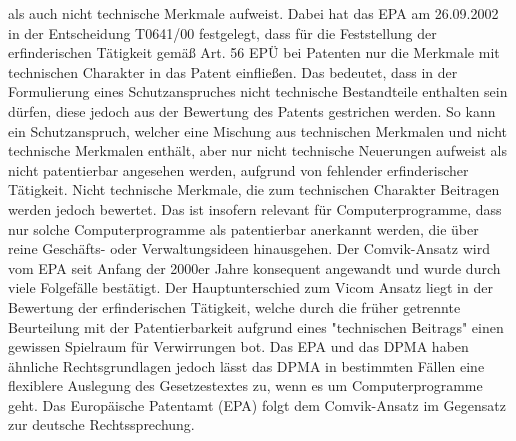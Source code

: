 als auch nicht technische Merkmale aufweist. 
Dabei hat das EPA am 26.09.2002 in der
Entscheidung T0641/00 festgelegt, dass für die Feststellung der
erfinderischen Tätigkeit gemäß Art. 56 EPÜ bei Patenten nur die 
Merkmale mit technischen Charakter in das Patent einfließen.
Das bedeutet, dass in der Formulierung eines Schutzanspruches
nicht technische Bestandteile enthalten sein dürfen, 
diese jedoch aus der Bewertung des Patents gestrichen werden.
So kann ein Schutzanspruch, welcher eine Mischung aus technischen 
Merkmalen und nicht technische 
Merkmalen enthält, aber nur nicht technische Neuerungen aufweist 
als nicht patentierbar angesehen werden, aufgrund von fehlender
erfinderischer Tätigkeit. Nicht technische Merkmale,
die zum technischen Charakter Beitragen werden jedoch bewertet.
Das ist insofern relevant für Computerprogramme,
dass nur solche Computerprogramme als patentierbar anerkannt werden, 
die über reine Geschäfts- oder Verwaltungsideen hinausgehen.
Der Comvik-Ansatz wird vom EPA seit Anfang der 2000er Jahre 
konsequent angewandt und 
wurde durch viele Folgefälle bestätigt.
Der Hauptunterschied zum Vicom Ansatz liegt in der
Bewertung der erfinderischen Tätigkeit, welche durch
die früher getrennte Beurteilung mit 
der Patentierbarkeit aufgrund eines "technischen Beitrags"
einen gewissen Spielraum für Verwirrungen bot.
Das EPA und das DPMA haben ähnliche Rechtsgrundlagen
jedoch lässt das DPMA in bestimmten Fällen 
eine flexiblere Auslegung des Gesetzestextes zu, 
wenn es um Computerprogramme geht.
Das Europäische Patentamt (EPA) folgt dem Comvik-Ansatz
im Gegensatz zur deutsche Rechtssprechung.

